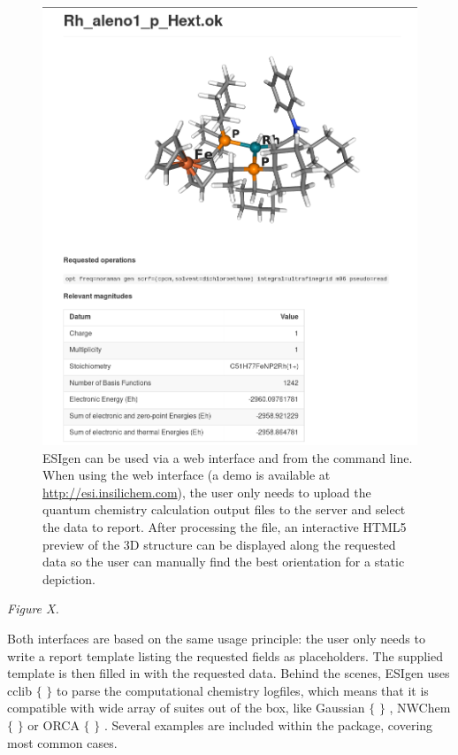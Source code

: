 \begin{figure}[H] %
	\includegraphics[width=\textwidth]{./figures/05/esigen.png}
	\cprotect\caption[ESIgen 3D report]{ESIgen can be used via a web interface and from the command line. When using the web interface (a demo is available at \href{esi.insilichem.com}{http://esi.insilichem.com}), the user only needs to upload the quantum chemistry calculation output files to the server and select the data to report. After processing the file, an interactive HTML5 preview of the 3D structure can be displayed along the requested data so the user can manually find the best orientation for a static depiction.}
	\label{fig:esigen}
\end{figure}






\begin{Center}
\textit{Figure X. }
\end{Center}

Both interfaces are based on the same usage principle: the user only needs to write a report template listing the requested fields as placeholders. The supplied template is then filled in with the requested data. Behind the scenes, ESIgen uses cclib $ \{ $ $ \} $  to parse the computational chemistry logfiles, which means that it is compatible with wide array of suites out of the box, like Gaussian $ \{ $ $ \} $ , NWChem $ \{ $ $ \} $  or ORCA $ \{ $ $ \} $ . Several examples are included within the package, covering most common cases.

